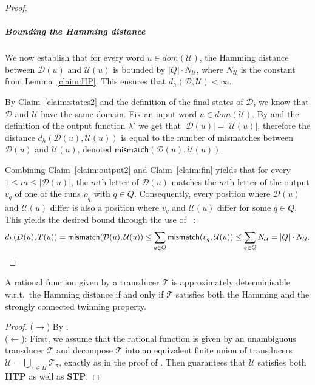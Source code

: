 \documentclass[a4paper,UKenglish,cleveref, autoref, thm-restate,authorcolumns, colorlinks]{lipics-v2021}
\newcommand\dom{\mathit{dom}}
\newcommand\calD{\mathcal{D}}
\newcommand\calT{\mathcal{T}}
\newcommand\calU{\mathcal{U}}
\newcommand{\STP}[0]{\textbf{STP}}
\newcommand{\HTP}[0]{\textbf{HTP}}
\newcommand{\dHam}[2]{d_{h}(#1,#2)}
\begin{document}
{\begin{proof}
    \subparagraph*{Bounding the Hamming distance}
    We now establish that for every word $u \in \dom(\calU)$,
    the Hamming distance between $\calD(u)$ and $\calU(u)$ is bounded by $|Q| \cdot N_\calU$,
    where  $N_\calU$ is the constant from Lemma~\ref{claim:HP}.
    This ensures that $\dHam{\calD}{\calU} < \infty$.
    
    By Claim~\ref{claim:states2} and the definition of the final states of $\calD$,
    we know that $\calD$ and $\calU$ have the same domain.
    Fix an input word $u \in \dom(\calU)$.
    By  and the definition of the output function $\lambda'$
    we get that $|\calD(u)| = |\calU(u)|$,
    therefore the distance $\dHam{\calD(u)}{\calU(u)}$
    is equal to the number of mismatches
    between $\calD(u)$ and $\calU(u)$, denoted $\textsf{mismatch}(\calD(u),\calU(u))$.
    
    Combining Claim~\ref{claim:output2} and Claim~\ref{claim:fin}
    yields that for every $1 \leq m \leq |\calD(u)|$,
    the $m$th letter of $\calD(u)$ matches
    the $m$th letter of the output $v_q$ of one of the runs $\rho_q$ with $q \in Q$.
    Consequently, every position where $\calD(u)$ and $\calU(u)$
    differ is also a position where $v_q$ and $\calU(u)$ differ for some $q \in Q$.
    This yields the desired bound through the use of ~: 
    \[
        \dHam{D(u)}{T(u)} = \textsf{mismatch}(\calD(u),\calU(u))
        \leq \sum_{q \in Q} \textsf{mismatch}(v_q,\calU(u))
        \leq \sum_{q \in Q} N_\calU = |Q| \cdot N_\calU. \qedhere
    \]
\end{proof}

\begin{lemma}\label{theorem:approxdetHamming}
    A rational function given by a transducer $\calT$
    is approximately determinisable w.r.t.~the Hamming distance
    if and only if $\calT$ satisfies
    both the Hamming and the strongly connected twinning property.
\end{lemma}
\begin{proof}
    ($\rightarrow$) By .\\
    ($\leftarrow$):
    First, we assume that the rational function is given by an unambiguous transducer $\calT$ and
    decompose $\calT$ into an equivalent finite union of transducers
    $\calU = \bigcup_{\pi \in \Pi} \calT_\pi$, exactly as in the proof of . 
    Then   guarantees that $\calU$
    satisfies both \HTP{} as well as \STP{}.


\end{proof}}
\end{document}
